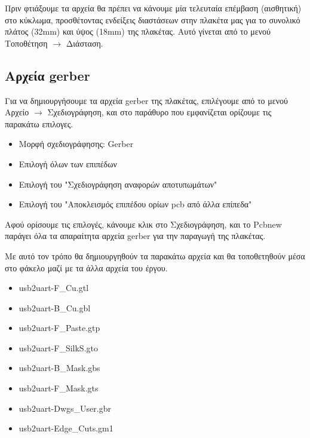 \documentclass[a4paper]{article}
\begin{document}
Πριν φτιάξουμε τα αρχεία θα πρέπει να κάνουμε μία τελευταία επέμβαση (αισθητική) στο κύκλωμα, προσθέτοντας ενδείξεις διαστάσεων στην πλακέτα μας για το συνολικό πλάτος (32mm) και ύψος (18mm) της πλακέτας. Αυτό γίνεται από το μενού Τοποθέτηση $\rightarrow$ Διάσταση.

\begin{figure}
  \begin{center}
    \label{fig:kicad-main}
  \end{center}
\end{figure}

\subsection{Αρχεία gerber}
Για να δημιουργήσουμε τα αρχεία gerber της πλακέτας, επιλέγουμε από το μενού Αρχείο $\rightarrow$ Σχεδιογράφηση, και στο παράθυρο που εμφανίζεται ορίζουμε τις παρακάτω επιλογες.

\begin{itemize}
    \item Μορφή σχεδιογράφησης: Gerber
    \item Επιλογή όλων των επιπέδων
    \item Επιλογή του "Σχεδιογράφηση αναφορών αποτυπωμάτων"
    \item Επιλογή του "Αποκλεισμός επιπέδου ορίων pcb από άλλα επίπεδα"
\end{itemize}

\begin{figure}
  \begin{center}
    \label{fig:kicad-main}
  \end{center}
\end{figure}

Αφού ορίσουμε τις επιλογές, κάνουμε κλικ στο Σχεδιογράφηση, και το \textenglish{Pcbnew} παράγει όλα τα απαραίτητα αρχεία gerber για την παραγωγή της πλακέτας.

Με αυτό τον τρόπο θα δημιουργηθούν τα παρακάτω αρχεία και θα τοποθετηθούν μέσα στο φάκελο μαζί με τα άλλα αρχεία του έργου.

\begin{itemize}
    \item usb2uart-F\_Cu.gtl
    \item usb2uart-B\_Cu.gbl
    \item usb2uart-F\_Paste.gtp
    \item usb2uart-F\_SilkS.gto
    \item usb2uart-B\_Mask.gbs
    \item usb2uart-F\_Mask.gts
    \item usb2uart-Dwgs\_User.gbr
    \item usb2uart-Edge\_Cuts.gm1
\end{itemize}
\end{document}
